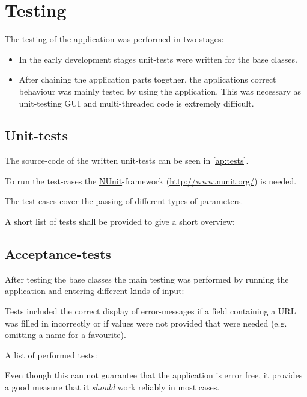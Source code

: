 \chapter{Testing}\label{ch:testing} %

The testing of the application was performed in two stages:

\begin{itemize}
\item In the early development stages unit-tests were written for the base classes.
\item After chaining the application parts together, the applications correct behaviour was mainly tested by using the application. This was necessary as unit-testing \ac{GUI} and multi-threaded code is extremely difficult.
\end{itemize}

\section{Unit-tests}
\label{sec:unit_tests}

The source-code of the written unit-tests can be seen in \autoref{ap:tests}.

To run the test-cases the \href{http://www.nunit.org/}{NUnit}-framework (\url{http://www.nunit.org/}) is needed.

The test-cases cover the passing of different types of parameters.

A short list of tests shall be provided to give a short overview:


\section{Acceptance-tests}
\label{sec:acceptance_tests}

After testing the base classes the main testing was performed by running the application and entering different kinds of input:

Tests included the correct display of error-messages if a field containing a \ac{URL} was filled in incorrectly or if values were not provided that were needed (e.g. omitting a name for a favourite).

A list of performed tests:


Even though this can not guarantee that the application is error free, it provides a good measure that it \textit{should} work reliably in most cases.
